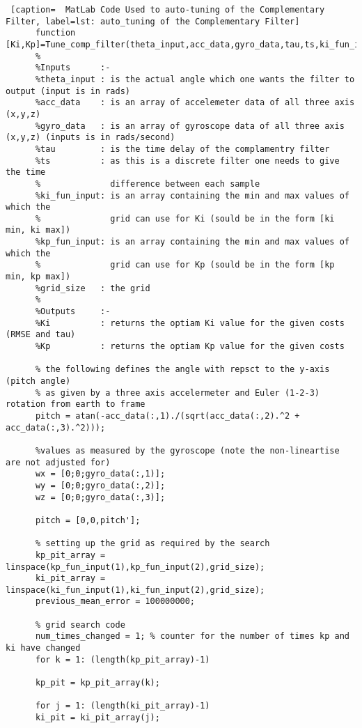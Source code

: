       \begin{lstlisting} [caption=  MatLab Code Used to auto-tuning of the Complementary Filter, label=lst: auto_tuning of the Complementary Filter]
      function [Ki,Kp]=Tune_comp_filter(theta_input,acc_data,gyro_data,tau,ts,ki_fun_input,kp_fun_input,grid_size)  
      %
      %Inputs      :-
      %theta_input : is the actual angle which one wants the filter to output (input is in rads)
      %acc_data    : is an array of accelemeter data of all three axis (x,y,z)
      %gyro_data   : is an array of gyroscope data of all three axis (x,y,z) (inputs is in rads/second)
      %tau         : is the time delay of the complamentry filter
      %ts          : as this is a discrete filter one needs to give the time
      %              difference between each sample
      %ki_fun_input: is an array containing the min and max values of which the
      %              grid can use for Ki (sould be in the form [ki min, ki max])
      %kp_fun_input: is an array containing the min and max values of which the
      %              grid can use for Kp (sould be in the form [kp min, kp max])
      %grid_size   : the grid 
      %
      %Outputs     :- 
      %Ki          : returns the optiam Ki value for the given costs (RMSE and tau)
      %Kp          : returns the optiam Kp value for the given costs
      
      % the following defines the angle with repsct to the y-axis (pitch angle) 
      % as given by a three axis accelermeter and Euler (1-2-3) rotation from earth to frame  
      pitch = atan(-acc_data(:,1)./(sqrt(acc_data(:,2).^2 + acc_data(:,3).^2))); 
      
      %values as measured by the gyroscope (note the non-lineartise are not adjusted for)
      wx = [0;0;gyro_data(:,1)];
      wy = [0;0;gyro_data(:,2)];
      wz = [0;0;gyro_data(:,3)];
      
      pitch = [0,0,pitch'];
      
      % setting up the grid as required by the search
      kp_pit_array = linspace(kp_fun_input(1),kp_fun_input(2),grid_size);
      ki_pit_array = linspace(ki_fun_input(1),ki_fun_input(2),grid_size);
      previous_mean_error = 100000000;
      
      % grid search code
      num_times_changed = 1; % counter for the number of times kp and ki have changed
      for k = 1: (length(kp_pit_array)-1)
      
      kp_pit = kp_pit_array(k);
      
      for j = 1: (length(ki_pit_array)-1)
      ki_pit = ki_pit_array(j);
      

\end{lstlisting}
